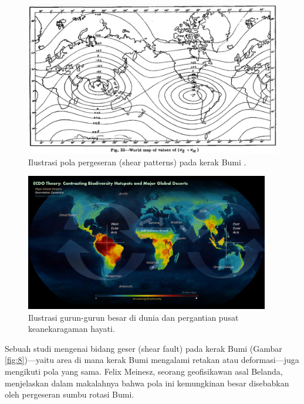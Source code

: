 \documentclass[10pt,twocolumn,letterpaper]{article}
\begin{document}
\begin{figure}[t]
\begin{center}
   \includegraphics[width=1\linewidth]{meinesz3.jpg}
\end{center}
   \caption{Ilustrasi pola pergeseran (shear patterns) pada kerak Bumi \cite{36}.}
\label{fig:8}
\label{fig:onecol}
\end{figure}
\begin{figure}[t]
\begin{center}
\includegraphics[width=0.95\textwidth]{biodiversity.jpg}
\end{center}
   \caption{Ilustrasi gurun-gurun besar di dunia dan pergantian pusat keanekaragaman hayati\cite{28}.}
\label{fig:9}
\end{figure}

Sebuah studi mengenai bidang geser (shear fault) pada kerak Bumi (Gambar \ref{fig:8})—yaitu area di mana kerak Bumi mengalami retakan atau deformasi—juga mengikuti pola yang sama. Felix Meinesz, seorang geofisikawan asal Belanda, menjelaskan dalam makalahnya \cite{36} bahwa pola ini kemungkinan besar disebabkan oleh pergeseran sumbu rotasi Bumi.
\end{document}
